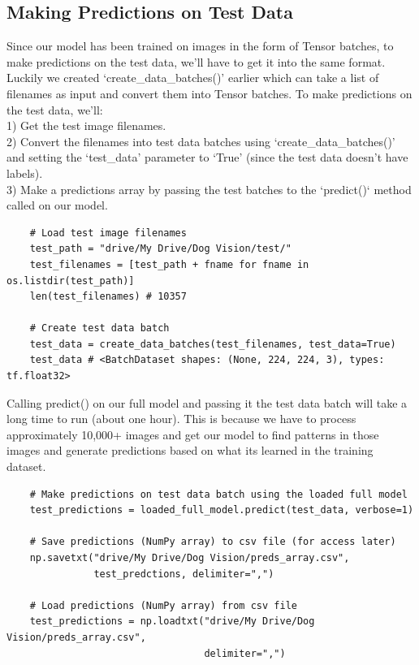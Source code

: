 \documentclass[11pt, a4paper]{article}
\begin{document}
\begin{spacing}{1.1}
	\subsection{Making Predictions on Test Data}
	Since our model has been trained on images in the form of Tensor batches, to make predictions on the test data, we'll have to get it into the same format. Luckily we created `create\_data\_batches()' earlier which can take a list of filenames as input and convert them into Tensor batches.	To make predictions on the test data, we'll: \vspace*{1mm} \\
	\hspace*{2mm} 1) Get the test image filenames. \\
	\hspace*{2mm} 2) Convert the filenames into test data batches using `create\_data\_batches()' and setting the `test\_data' \hspace*{7mm} parameter to `True' (since the test data doesn't have labels). \\
	\hspace*{2mm} 3) Make a predictions array by passing the test batches to the `predict()` method called on our model. 
	\begin{lstlisting}
	# Load test image filenames
	test_path = "drive/My Drive/Dog Vision/test/"
	test_filenames = [test_path + fname for fname in os.listdir(test_path)]
	len(test_filenames) # 10357
	
	# Create test data batch
	test_data = create_data_batches(test_filenames, test_data=True)
	test_data # <BatchDataset shapes: (None, 224, 224, 3), types: tf.float32> \end{lstlisting} \newpage

	\noindent Calling predict() on our full model and passing it the test data batch will take a long time to run (about one hour). This is because we have to process approximately 10,000+ images and get our model to find patterns in those images and generate predictions based on what its learned in the training dataset. 
	\begin{lstlisting}
	# Make predictions on test data batch using the loaded full model
	test_predictions = loaded_full_model.predict(test_data,	verbose=1)
	
	# Save predictions (NumPy array) to csv file (for access later)
	np.savetxt("drive/My Drive/Dog Vision/preds_array.csv", 
	           test_predctions, delimiter=",")	
	
	# Load predictions (NumPy array) from csv file 
	test_predictions = np.loadtxt("drive/My Drive/Dog Vision/preds_array.csv", 
	                              delimiter=",") 
	

\end{lstlisting}
\end{spacing}
\end{document}
